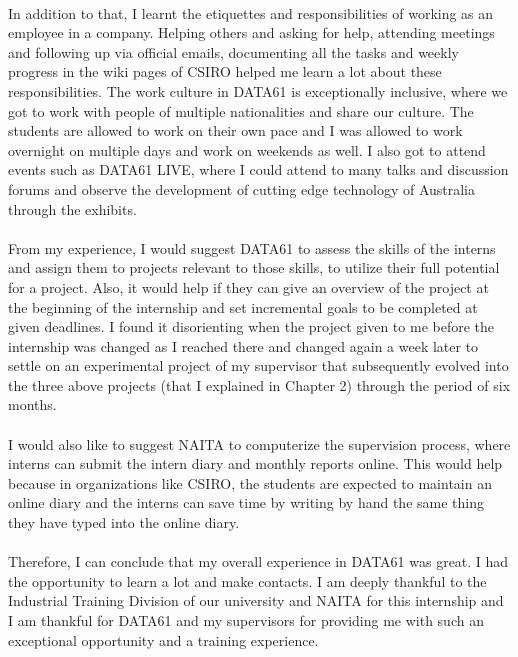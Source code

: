 \paragraph{}
In addition to that, I learnt the etiquettes and responsibilities of working as an employee in a company. Helping others and asking for help, attending meetings and following up via official emails, documenting all the tasks and weekly progress in the wiki pages of CSIRO helped me learn a lot about these responsibilities. The work culture in DATA61 is exceptionally inclusive, where we got to work with people of multiple nationalities and share our culture. The students are allowed to work on their own pace and I was allowed to work overnight on multiple days and work on weekends as well. I also got to attend events such as DATA61 LIVE, where I could attend to many talks and discussion forums and observe the development of cutting edge technology of Australia through the exhibits.

\paragraph{}
From my experience, I would suggest DATA61 to assess the skills of the interns and assign them to projects relevant to those skills, to utilize their full potential for a project. Also, it would help if they can give an overview of the project at the beginning of the internship and set incremental goals to be completed at given deadlines. I found it disorienting when the project given to me before the internship was changed as I reached there and changed again a week later to settle on an experimental project of my supervisor that subsequently evolved into the three above projects (that I explained in Chapter 2) through the period of six months. 

\paragraph{}
I would also like to suggest NAITA to computerize the supervision process, where interns can submit the intern diary and monthly reports online. This would help because in organizations like CSIRO, the students are expected to maintain an online diary and the interns can save time by writing by hand the same thing they have typed into the online diary.

\paragraph{}
Therefore, I can conclude that my overall experience in DATA61 was great. I had the opportunity to learn a lot and make contacts. I am deeply thankful to the Industrial Training Division of our university and NAITA for this internship and I am thankful for DATA61 and my supervisors for providing me with such an exceptional opportunity and a training experience.





